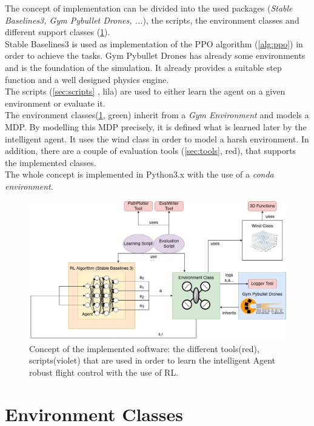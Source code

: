 The concept of implementation can be divided into the used packages (\emph{Stable Baselines3, Gym Pybullet Drones, ...}), the scripts, the environment classes and different support classes (\cref{fig:concept}).\\
Stable Baselines3 is used as implementation of the PPO algorithm (\cref{alg:ppo}) in order to achieve the tasks. Gym Pybullet Drones has already some environments and is the foundation of the simulation. It already provides a suitable step function and a well designed physics engine.\\
The scripts (\cref{sec:scripts} , lila) are used to either learn the agent on a given environment or evaluate it.\\
The environment classes(\cref{sec:env}, green) inherit from a \emph{Gym Environment} and models a MDP. By modelling this MDP precisely, it is defined what is learned later by the intelligent agent. It uses the wind class in order to model a harsh environment.
In addition, there are a couple of evaluation tools (\cref{sec:tools}, red), that supports the implemented classes.\\
\newline
The whole concept is implemented in Python3.x with the use of a \emph{conda environment}.

\begin{figure}[htp]
	\centering
	\includegraphics[width= \linewidth]{figures/concept.png}
	\caption{Concept of the implemented software: the different tools(red), scripts(violet) that are used in order to learn the intelligent Agent robust flight control with the use of RL.}
	\label{fig:concept}
\end{figure}
\newpage

\section{Environment Classes} \label{sec:env}



